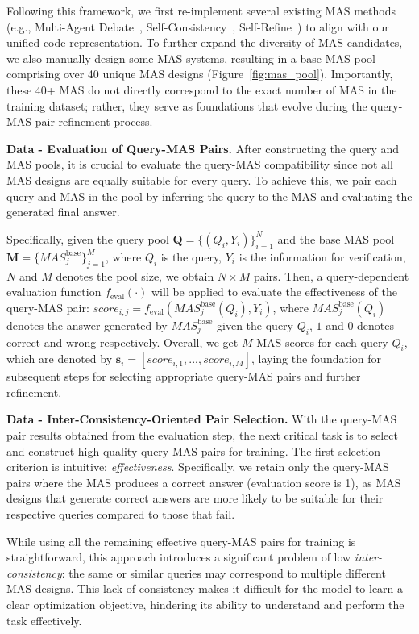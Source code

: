 \documentclass{article}
\theoremstyle{plain}
\theoremstyle{definition}
\theoremstyle{remark}
\begin{document}
Following this framework, we first re-implement several existing MAS methods (e.g., Multi-Agent Debate~\cite{duimproving}, Self-Consistency~\cite{wangself}, Self-Refine~\cite{madaan2024self}) to align with our unified code representation.
To further expand the diversity of MAS candidates, we also manually design some MAS systems, resulting in a base MAS pool comprising over 40 unique MAS designs (Figure~\ref{fig:mas_pool}).
Importantly, these 40+ MAS do not directly correspond to the exact number of MAS in the training dataset;
rather, they serve as foundations that evolve during the query-MAS pair refinement process. 


\textbf{Data - Evaluation of Query-MAS Pairs.}
After constructing the query and MAS pools, it is crucial to evaluate the query-MAS compatibility since not all MAS designs are equally suitable for every query.
To achieve this, we pair each query and MAS in the pool by inferring the query to the MAS and evaluating the generated final answer.

Specifically, given the query pool $\mathbf{Q}=\{(Q_i, Y_i)\}_{i=1}^{N}$ and the base MAS pool $\mathbf{M}=\{MAS^{\text{base}}_j\}_{j=1}^M$, where $Q_i$ is the query, $Y_i$ is the information for verification, $N$ and $M$ denotes the pool size, we obtain $N \times M$ pairs.
Then, a query-dependent evaluation function $f_{\text{eval}}(\cdot)$ will be applied to evaluate the effectiveness of the query-MAS pair: $score_{i,j}=f_{\text{eval}}(MAS^{\text{base}}_j(Q_i), Y_i)$, where $MAS^{\text{base}}_j(Q_i)$ denotes the answer generated by $MAS^{\text{base}}_j$ given the query $Q_i$, $1$ and $0$ denotes correct and wrong respectively.
Overall, we get $M$ MAS scores for each query $Q_i$, which are denoted by $\mathbf{s}_i=[score_{i,1}, ..., score_{i,M}]$, laying the foundation for subsequent steps for selecting appropriate query-MAS pairs and further refinement.

\textbf{Data - Inter-Consistency-Oriented Pair Selection.}
With the query-MAS pair results obtained from the evaluation step, the next critical task is to select and construct high-quality query-MAS pairs for training.
The first selection criterion is intuitive: \textit{effectiveness}.
Specifically, we retain only the query-MAS pairs where the MAS produces a correct answer (evaluation score is 1), as MAS designs that generate correct answers are more likely to be suitable for their respective queries compared to those that fail.

While using all the remaining effective query-MAS pairs for training is straightforward, this approach introduces a significant problem of low \textit{inter-consistency}: the same or similar queries may correspond to multiple different MAS designs.
This lack of consistency makes it difficult for the model to learn a clear optimization objective, hindering its ability to understand and perform the task effectively.
\end{document}
